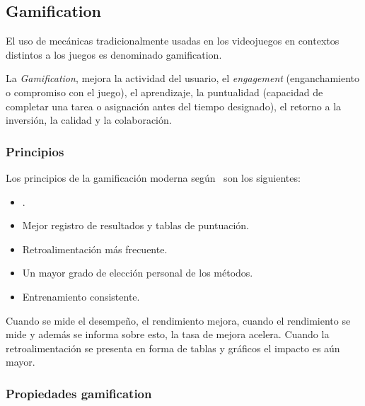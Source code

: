 \subsection{Gamification}


El uso de mecánicas tradicionalmente usadas en los videojuegos en
contextos distintos a los juegos es denominado gamification.



La \emph{Gamification}, mejora la actividad del usuario, el \emph{engagement}
(enganchamiento o compromiso con el juego), el aprendizaje, la puntualidad
(capacidad de completar una tarea o asignación antes del tiempo designado), el
retorno a la inversión, la calidad y la colaboración.

\subsubsection{Principios}

Los principios de la gamificación moderna según~\cite{hj:gamification} son los
siguientes:

\begin{itemize}
    \item {}.
    \item Mejor registro de resultados y tablas de puntuación.
    \item Retroalimentación más frecuente.
    \item Un mayor grado de elección personal de los métodos.
    \item Entrenamiento consistente.
\end{itemize}


Cuando se mide el desempeño, el rendimiento mejora, cuando el rendimiento se
mide y además se informa sobre esto, la tasa de mejora acelera. Cuando la
retroalimentación se presenta en forma de tablas y gráficos el impacto es aún
mayor.

\subsubsection{Propiedades gamification}

